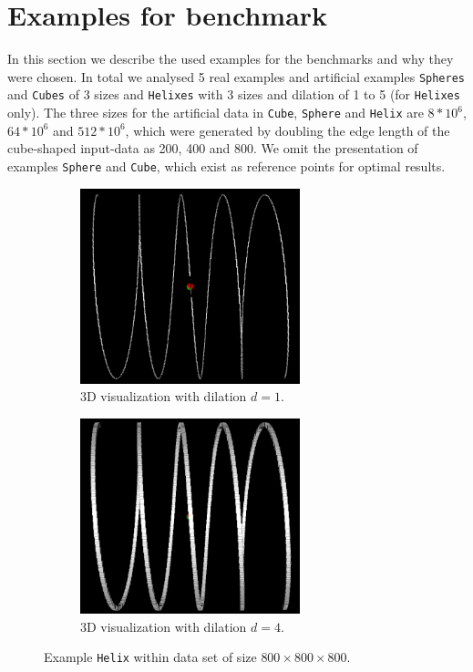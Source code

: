 \documentclass{article}
\begin{document}
\section{Examples for benchmark}\label{sec:examples}
In this section we describe the used examples for the benchmarks and why they were chosen.
In total we analysed 5 real examples and artificial examples \texttt{Spheres} and \texttt{Cubes} of 3 sizes and \texttt{Helixes} with 3 sizes and dilation of 1 to 5 (for \texttt{Helixes} only).
The three sizes for the artificial data in \texttt{Cube}, \texttt{Sphere} and \texttt{Helix} are $8*10^6$, $64*10^6$ and $512*10^6$, which were generated by doubling the edge length of the cube-shaped input-data as 200, 400 and 800.
We omit the presentation of examples \texttt{Sphere} and \texttt{Cube}, which exist as reference points for optimal results.
\begin{figure}[h]
\centering
  \begin{subfigure}[t]{0.5\textwidth}
    \centering
  \vskip 0pt
    \includegraphics[width=0.7\textwidth]{images/helixd1_800.png}
    \caption{3D visualization with dilation $d=1$.}\label{fig:helixd1_800}
  \end{subfigure}%
  \begin{subfigure}[t]{0.5\textwidth}
    \centering
  \vskip 0pt
    \includegraphics[width=0.7\textwidth]{images/helixd4_800.png}
    \caption{3D visualization with dilation $d=4$.}\label{fig:helixd4_800}
  \end{subfigure}%
  \caption{Example \texttt{Helix} within data set of size $800\times 800\times 800$.}\label{fig:helixes}%
\end{figure}
\end{document}
